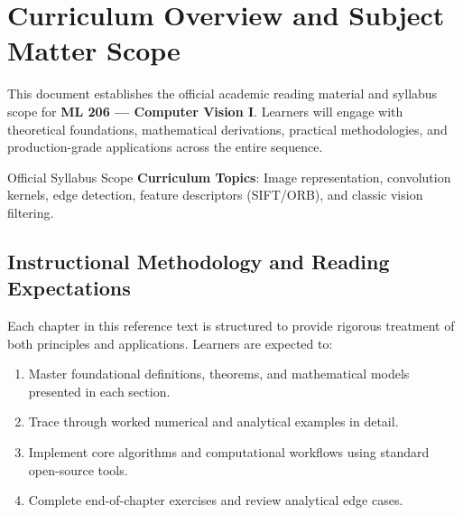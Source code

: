 \section{Curriculum Overview and Subject Matter Scope}

This document establishes the official academic reading material and syllabus scope for \textbf{ML 206 --- Computer Vision I}. Learners will engage with theoretical foundations, mathematical derivations, practical methodologies, and production-grade applications across the entire sequence.

\begin{InsightBox}{Official Syllabus Scope}
  \textbf{Curriculum Topics}: Image representation, convolution kernels, edge detection, feature descriptors (SIFT/ORB), and classic vision filtering.
\end{InsightBox}

\subsection{Instructional Methodology and Reading Expectations}

Each chapter in this reference text is structured to provide rigorous treatment of both principles and applications. Learners are expected to:
\begin{enumerate}
  \item Master foundational definitions, theorems, and mathematical models presented in each section.
  \item Trace through worked numerical and analytical examples in detail.
  \item Implement core algorithms and computational workflows using standard open-source tools.
  \item Complete end-of-chapter exercises and review analytical edge cases.
\end{enumerate}

